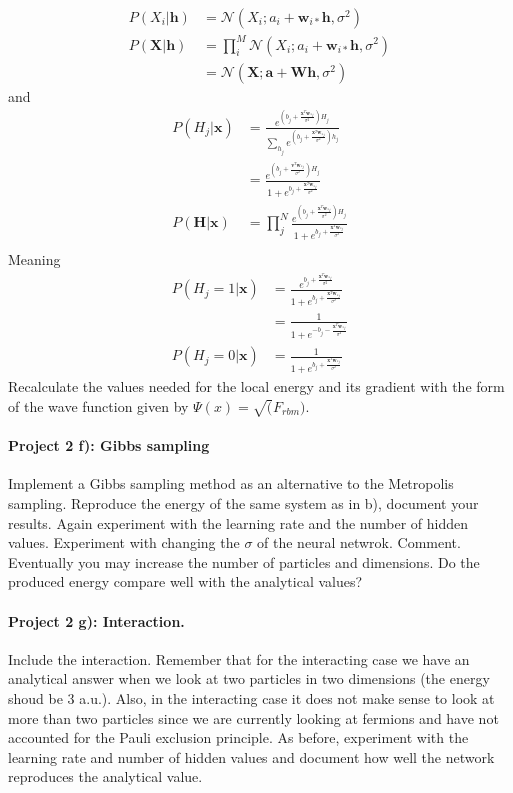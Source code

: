 \documentclass[%
oneside,                 %
final,                   %
10pt]{article}
\begin{document}
\begin{align}
	P(X_i|\mathbf{h}) &= \mathcal{N}(X_i; a_i+\mathbf{w}_{i*} \mathbf{h}, \sigma^2) \\
	P(\mathbf{X}|\mathbf{h}) &= \prod_i^M \mathcal{N}(X_i; a_i+\mathbf{w}_{i*} \mathbf{h}, \sigma^2) \\
	&= \mathcal{N} (\mathbf{X}; \mathbf{a}+\mathbf{W}\mathbf{h},\sigma^2)
\end{align}
and 
\begin{align}
	P(H_j|\mathbf{x}) &= \frac{e^{(b_j+\frac{\mathbf{x}^T\mathbf{w}_{*j}}{\sigma^2})H_j}}{\sum_{h_j}e^{(b_j+\frac{\mathbf{x}^T\mathbf{w}_{*j}}{\sigma^2})h_j}} \\
	&= \frac{e^{(b_j+\frac{\mathbf{v}^T\mathbf{w}_{*j}}{\sigma^2})H_j}}{1+e^{b_j+\frac{\mathbf{x}^T\mathbf{w}_{*j}}{\sigma^2}}} \\
	P(\mathbf{H}|\mathbf{x}) &= \prod_j^N \frac{e^{(b_j+\frac{\mathbf{x}^T\mathbf{w}_{*j}}{\sigma^2})H_j}}{1+e^{b_j+\frac{\mathbf{x}^T\mathbf{w}_{*j}}{\sigma^2}}} \\
\end{align}
Meaning
\begin{align}
	P(H_j=1|\mathbf{x}) &= \frac{e^{b_j+\frac{\mathbf{x}^T\mathbf{w}_{*j}}{\sigma^2}}}{1+e^{b_j+\frac{\mathbf{x}^T\mathbf{w}_{*j}}{\sigma^2}}} \\
	&= \frac{1}{1+e^{-b_j-\frac{\mathbf{x}^T\mathbf{w}_{*j}}{\sigma^2}}} \\
	P(H_j=0|\mathbf{x}) &= \frac{1}{1+e^{b_j+\frac{\mathbf{x}^T\mathbf{w}_{*j}}{\sigma^2}}} 
\end{align}
Recalculate the values needed for the local energy and its gradient with the form of the wave function given by $\Psi(x) = \sqrt(F_{rbm})$.

\paragraph{Project 2 f): Gibbs sampling}
Implement a Gibbs sampling method as an alternative to the Metropolis sampling. Reproduce the energy of the same system as in b), document your results. Again experiment with the learning rate and the number of hidden values. Experiment with changing the $\sigma$ of the neural netwrok. Comment. Eventually you may increase the number of particles and dimensions. Do the produced energy compare well with the analytical values?

\paragraph{Project 2 g): Interaction.}
Include the interaction. Remember that for the interacting case we
have an analytical answer when we look at two particles in two
dimensions (the energy shoud be 3 a.u.). Also, in the interacting case
it does not make sense to look at more than two particles since we are
currently looking at fermions and have not accounted for the Pauli
exclusion principle.  As before, experiment with the learning rate and
number of hidden values and document how well the network reproduces
the analytical value.
\end{document}
